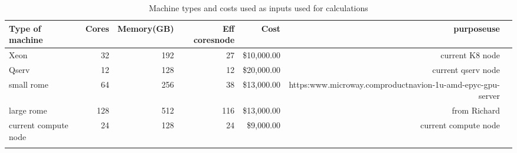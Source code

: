 \tiny \begin{longtable} { |p{}  |r  |r  |r  |r  |r  |r |} 
\caption{Machine types and costs used as inputs used for calculations \label{tab:Machines}}\\ 
\hline 
\textbf{Type of machine }&\textbf{Cores}&\textbf{Memory(GB)}&\textbf{Eff cores\/node}&\textbf{Cost}&\textbf{purpose\/use } \\ \hline
{Xeon }&{32}&{192}&{27}&{\$10,000.00}&{current K8 node } \\ \hline
{Qserv }&{12}&{128}&{12}&{\$20,000.00}&{current qserv node } \\ \hline
{small rome  }&{64}&{256}&{38}&{\$13,000.00}&{https:\/\/www.microway.com\/product\/navion-1u-amd-epyc-gpu-server\/} \\ \hline
{large rome }&{128}&{512}&{116}&{\$13,000.00}&{from Richard} \\ \hline
{current compute node }&{24}&{128}&{24}&{\$9,000.00}&{current compute node} \\ \hline
{}&{}&{}&{}&{}&{} \\ \hline
\end{longtable} \normalsize
